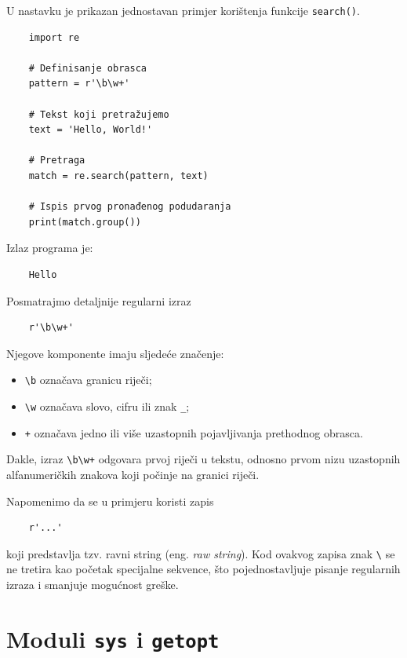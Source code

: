U nastavku je prikazan jednostavan primjer korištenja funkcije \texttt{search()}.

\begin{verbatim}
	import re
	
	# Definisanje obrasca
	pattern = r'\b\w+'
	
	# Tekst koji pretražujemo
	text = 'Hello, World!'
	
	# Pretraga
	match = re.search(pattern, text)
	
	# Ispis prvog pronađenog podudaranja
	print(match.group())
\end{verbatim}

Izlaz programa je:

\begin{verbatim}
	Hello
\end{verbatim}

Posmatrajmo detaljnije regularni izraz

\begin{verbatim}
	r'\b\w+'
\end{verbatim}

Njegove komponente imaju sljedeće značenje:

\begin{itemize}
	\item \texttt{\textbackslash b} označava granicu riječi;
	\item \texttt{\textbackslash w} označava slovo, cifru ili znak \texttt{\_};
	\item \texttt{+} označava jedno ili više uzastopnih pojavljivanja prethodnog obrasca.
\end{itemize}

Dakle, izraz \texttt{\textbackslash b\textbackslash w+} odgovara prvoj riječi u tekstu, odnosno prvom nizu uzastopnih alfanumeričkih znakova koji počinje na granici riječi.

Napomenimo da se u primjeru koristi zapis

\begin{verbatim}
	r'...'
\end{verbatim}

koji predstavlja tzv. ravni string (eng. \textit{raw string}). Kod ovakvog zapisa znak \texttt{\textbackslash} se ne tretira kao početak specijalne sekvence, što pojednostavljuje pisanje regularnih izraza i smanjuje mogućnost greške.

\section{Moduli \texttt{sys} i \texttt{getopt}}


